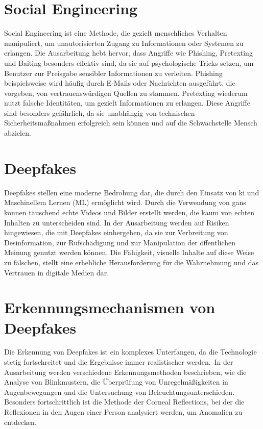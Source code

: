 \section*{Social Engineering}

Social Engineering ist eine Methode, die gezielt menschliches Verhalten manipuliert, um unautorisierten Zugang zu Informationen oder Systemen zu erlangen.
Die Ausarbeitung hebt hervor, dass Angriffe wie Phishing, Pretexting und Baiting besonders effektiv sind, da sie auf psychologische Tricks setzen, um Benutzer zur Preisgabe sensibler Informationen zu verleiten.
Phishing beispielsweise wird häufig durch E-Mails oder Nachrichten ausgeführt, die vorgeben, von vertrauenswürdigen Quellen zu stammen.
Pretexting wiederum nutzt falsche Identitäten, um gezielt Informationen zu erlangen.
Diese Angriffe sind besonders gefährlich, da sie unabhängig von technischen Sicherheitsmaßnahmen erfolgreich sein können und auf die Schwachstelle Mensch abzielen.

\section*{Deepfakes}

Deepfakes stellen eine moderne Bedrohung dar, die durch den Einsatz von \gls{ki} und Maschinellem Lernen (ML) ermöglicht wird.
Durch die Verwendung von \glspl{gan} können täuschend echte Videos und Bilder erstellt werden, die kaum von echten Inhalten zu unterscheiden sind.
In der Ausarbeitung werden auf Risiken hingewiesen, die mit Deepfakes einhergehen, da sie zur Verbreitung von Desinformation, zur Rufschädigung und zur Manipulation der öffentlichen Meinung genutzt werden können.
Die Fähigkeit, visuelle Inhalte auf diese Weise zu fälschen, stellt eine erhebliche Herausforderung für die Wahrnehmung und das Vertrauen in digitale Medien dar.

\section*{Erkennungsmechanismen von Deepfakes}

Die Erkennung von Deepfakes ist ein komplexes Unterfangen, da die Technologie stetig fortschreitet und die Ergebnisse immer realistischer werden.\ In der Ausarbeitung werden verschiedene Erkennungsmethoden beschrieben, wie die Analyse von Blinkmustern, die Überprüfung von Unregelmäßigkeiten in Augenbewegungen und die Untersuchung von Beleuchtungsunterschieden.
Besonders fortschrittlich ist die Methode der Corneal Reflections, bei der die Reflexionen in den Augen einer Person analysiert werden, um Anomalien zu entdecken.

